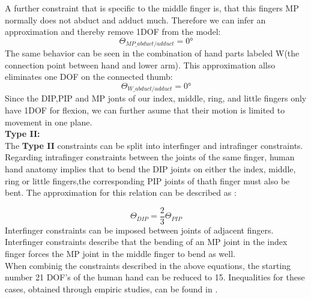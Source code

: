 A further constraint that is specific to the middle finger is, that this fingers MP normally does not abduct and adduct much. Therefore we can infer an approximation and thereby remove 1DOF from the model:
\begin{equation}
\Theta _{MP\_abduct/adduct}=0°
\end{equation}
The same behavior can be seen in the combination of hand parts labeled W(the connection point between hand and lower arm). This approximation allso eliminates one DOF on the connected thumb:
\begin{equation}
\Theta _{W\_abduct/adduct}=0°
\end{equation}
Since the DIP,PIP and MP jonts of our index, middle, ring, and little fingers only have 1DOF for flexion, we can further asume that their motion is limited to movement in one plane. \\
\textbf{Type II:}\\
The \textbf{Type II} constraints can be split into interfinger and intrafinger constraints. Regarding intrafinger constraints between the joints of the same finger, human hand anatomy implies that to bend the DIP joints  on  either the index, middle, ring or little fingers,the corresponding PIP joints of thath finger must also be bent. The approximation for this relation\cite{Rijpkema.1991} can be described as :

\begin{equation}
\Theta _{DIP} =\frac{2}{3}\Theta _{PIP}
\end{equation}
Interfinger constraints can be imposed between joints of adjacent fingers. Interfinger constraints describe that the bending of an MP joint in the index finger forces the MP joint in the middle finger to bend as well.\\
 When combinig the constraints described in the above equations, the starting number 21 DOF's of the human hand can be reduced to 15. Inequalities for these cases, obtained through empiric studies, can be found in \citep{LEE.1995}.\\
